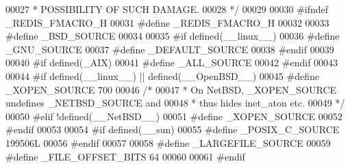 \begin{DoxyCode}
00027 \textcolor{comment}{ * POSSIBILITY OF SUCH DAMAGE.}
00028 \textcolor{comment}{ */}
00029 
00030 \textcolor{preprocessor}{#}\textcolor{preprocessor}{ifndef} \textcolor{preprocessor}{\_REDIS\_FMACRO\_H}
00031 \textcolor{preprocessor}{#}\textcolor{preprocessor}{define} \textcolor{preprocessor}{\_REDIS\_FMACRO\_H}
00032 
00033 \textcolor{preprocessor}{#}\textcolor{preprocessor}{define} \textcolor{preprocessor}{\_BSD\_SOURCE}
00034 
00035 \textcolor{preprocessor}{#}\textcolor{preprocessor}{if} \textcolor{preprocessor}{defined}\textcolor{preprocessor}{(}\_\_linux\_\_\textcolor{preprocessor}{)}
00036 \textcolor{preprocessor}{#}\textcolor{preprocessor}{define} \textcolor{preprocessor}{\_GNU\_SOURCE}
00037 \textcolor{preprocessor}{#}\textcolor{preprocessor}{define} \textcolor{preprocessor}{\_DEFAULT\_SOURCE}
00038 \textcolor{preprocessor}{#}\textcolor{preprocessor}{endif}
00039 
00040 \textcolor{preprocessor}{#}\textcolor{preprocessor}{if} \textcolor{preprocessor}{defined}\textcolor{preprocessor}{(}\textcolor{preprocessor}{\_AIX}\textcolor{preprocessor}{)}
00041 \textcolor{preprocessor}{#}\textcolor{preprocessor}{define} \textcolor{preprocessor}{\_ALL\_SOURCE}
00042 \textcolor{preprocessor}{#}\textcolor{preprocessor}{endif}
00043 
00044 \textcolor{preprocessor}{#}\textcolor{preprocessor}{if} \textcolor{preprocessor}{defined}\textcolor{preprocessor}{(}\_\_linux\_\_\textcolor{preprocessor}{)} \textcolor{preprocessor}{||} \textcolor{preprocessor}{defined}\textcolor{preprocessor}{(}\textcolor{preprocessor}{\_\_OpenBSD\_\_}\textcolor{preprocessor}{)}
00045 \textcolor{preprocessor}{#}\textcolor{preprocessor}{define} \textcolor{preprocessor}{\_XOPEN\_SOURCE} 700
00046 \textcolor{comment}{/*}
00047 \textcolor{comment}{ * On NetBSD, \_XOPEN\_SOURCE undefines \_NETBSD\_SOURCE and}
00048 \textcolor{comment}{ * thus hides inet\_aton etc.}
00049 \textcolor{comment}{ */}
00050 \textcolor{preprocessor}{#}\textcolor{preprocessor}{elif} \textcolor{preprocessor}{!}\textcolor{preprocessor}{defined}\textcolor{preprocessor}{(}\textcolor{preprocessor}{\_\_NetBSD\_\_}\textcolor{preprocessor}{)}
00051 \textcolor{preprocessor}{#}\textcolor{preprocessor}{define} \textcolor{preprocessor}{\_XOPEN\_SOURCE}
00052 \textcolor{preprocessor}{#}\textcolor{preprocessor}{endif}
00053 
00054 \textcolor{preprocessor}{#}\textcolor{preprocessor}{if} \textcolor{preprocessor}{defined}\textcolor{preprocessor}{(}\textcolor{preprocessor}{\_\_sun}\textcolor{preprocessor}{)}
00055 \textcolor{preprocessor}{#}\textcolor{preprocessor}{define} \textcolor{preprocessor}{\_POSIX\_C\_SOURCE} 199506L
00056 \textcolor{preprocessor}{#}\textcolor{preprocessor}{endif}
00057 
00058 \textcolor{preprocessor}{#}\textcolor{preprocessor}{define} \textcolor{preprocessor}{\_LARGEFILE\_SOURCE}
00059 \textcolor{preprocessor}{#}\textcolor{preprocessor}{define} \textcolor{preprocessor}{\_FILE\_OFFSET\_BITS} 64
00060 
00061 \textcolor{preprocessor}{#}\textcolor{preprocessor}{endif}
\end{DoxyCode}
